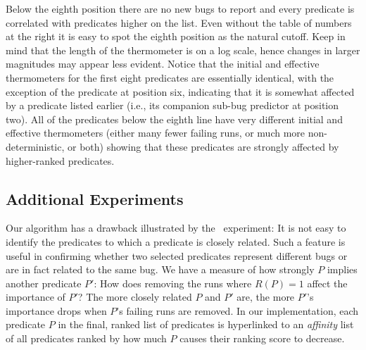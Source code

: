 Below the eighth position there are no new bugs to report and every
predicate is correlated with predicates higher on the list.  Even
without the table of numbers at the right it is easy to spot the
eighth position as the natural cutoff.  Keep in mind that the length of 
the thermometer is on a log scale, hence changes in larger magnitudes may 
appear less evident.  Notice that the initial and
effective thermometers for the first eight predicates are essentially
identical, with the exception of the predicate at position six, indicating
that it is somewhat affected by a predicate listed earlier (i.e., its companion
sub-bug predictor 
at position two).  All of the predicates below the eighth line have very
different initial and effective thermometers (either many fewer
failing runs, or much more non-deterministic, or both) showing that these
predicates are strongly affected by 
higher-ranked predicates.




\subsection{Additional Experiments}

Our algorithm has a drawback illustrated by the \moss\ experiment: It
is not easy to identify the predicates to which a predicate is closely
related.  Such a feature is useful in confirming whether two selected
predicates represent different bugs or are in fact related to the same
bug.  We have a measure of how strongly $P$ implies another predicate
$P'$: How does removing the runs where $R(P) = 1$ affect the
importance of $P'$?  The more closely related $P$ and $P'$ are, the
more $P'$'s importance drops when $P$'s failing runs are removed.  In
our implementation, each predicate $P$ in the final, ranked list of
predicates is hyperlinked to an {\em affinity} list of all predicates
ranked by how much $P$ causes their ranking score to decrease.

